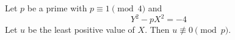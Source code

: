 \begin{conjecture}
    Let $p$ be a prime with $p\equiv1\pmod4$ and
\[
    Y^2-pX^2=-4
\]
    Let $u$ be the least positive value of $X$. Then $u\not\equiv0\pmod p$.
\end{conjecture}
